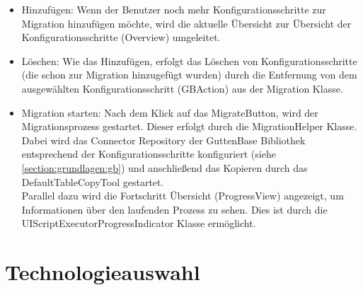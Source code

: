 	\begin{itemize}
		\item Hinzufügen: Wenn der Benutzer noch mehr Konfigurationsschritte zur Migration hinzufügen möchte, wird die aktuelle Übersicht zur Übersicht der Konfigurationsschritte (Overview) umgeleitet.
		\item Löschen: Wie das Hinzufügen, erfolgt das Löschen von Konfigurationsschritte (die schon zur Migration hinzugefügt wurden) durch die Entfernung von dem ausgewählten Konfigurationsschritt (GBAction) aus der Migration Klasse. 
		\item Migration starten: Nach dem Klick auf das \glqq Migrate\grqq Button, wird der Migrationsprozess gestartet. Dieser erfolgt durch die MigrationHelper Klasse. Dabei wird das Connector Repository der GuttenBase Bibliothek entsprechend der Konfigurationsschritte konfiguriert (siehe \ref{section:grundlagen:gb}) und anschließend das Kopieren durch das DefaultTableCopyTool gestartet. \\
		Parallel dazu wird die Fortschritt Übersicht (ProgressView) angezeigt, um Informationen über den laufenden Prozess zu sehen. Dies ist durch die UIScriptExecutorProgressIndicator Klasse ermöglicht.
		
	\end{itemize}


\section{Technologieauswahl}
	
